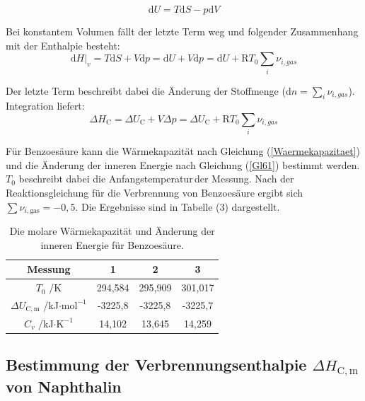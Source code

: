 \documentclass[12pt,a4paper,titlepage,headinclude,bibtotoc]{scrartcl}
\begin{document}
\begin{equation}
\mathrm{d}U= T\mathrm{d}S - p\mathrm{d}V
\end{equation} 

Bei konstantem Volumen fällt der letzte Term weg und folgender Zusammenhang mit der Enthalpie besteht:\\

\begin{equation} 
\mathrm{d}H|_v= T\mathrm{d}S + V\mathrm{d}p = \mathrm{d}U + V\mathrm{d}p = \mathrm{d}U +\mathrm{R}T_0\sum_i \nu_{i,gas}
\end{equation}

Der letzte Term beschreibt dabei die Änderung der Stoffmenge ($\mathrm{d}n= \sum_i \nu_{i,gas}$). Integration liefert:\\


\begin{equation} \label{Gl61}
\Delta H_\mathrm{C}= \Delta U_\mathrm{C} +V\Delta p= \Delta U_\mathrm{C} +\mathrm{R}T_0\sum_i \nu_{i,gas}
\end{equation}

Für Benzoesäure kann die Wärmekapazität nach Gleichung (\ref{Waermekapazitaet}) und die Änderung der inneren Energie nach Gleichung (\ref{Gl61}) bestimmt werden. $T_0$ beschreibt dabei die Anfangstemperatur\,der Messung. Nach der Reaktionsgleichung für die Verbrennung von Benzoesäure ergibt sich $\sum \nu_{i,\mathrm{gas}}= -0,5$. Die Ergebnisse sind in Tabelle (3) dargestellt.\\

\begin{table} \centering
\label{ErgebnisseBenz}\caption{Die molare Wärmekapazität und Änderung der inneren Energie für Benzoesäure.}
\begin{tabular}{c|c|c|c}
Messung& 1&2&3\\
\hline 
$T_0$ /K&294,584&295,909&301,017\\
$\Delta U_\mathrm{C,m}$ /kJ$\cdot \mathrm{mol}^{-1}$&
-3225,8&-3225,8&-3225,7\\
$C_{v}$ /kJ$\cdot \mathrm{K}^{-1}$&14,102&13,645&14,259\\
\end{tabular} 
\end{table}
\FloatBarrier

\subsection{Bestimmung der Verbrennungsenthalpie $\Delta H_\mathrm{C,m}$ von Naphthalin}
\end{document}

